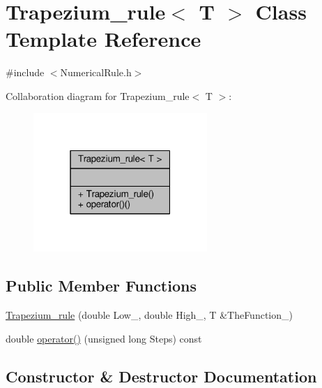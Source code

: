 \hypertarget{classTrapezium__rule}{}\section{Trapezium\+\_\+rule$<$ T $>$ Class Template Reference}
\label{classTrapezium__rule}


{\ttfamily \#include $<$Numerical\+Rule.\+h$>$}



Collaboration diagram for Trapezium\+\_\+rule$<$ T $>$\+:
\nopagebreak
\begin{figure}[H]
\begin{center}
\leavevmode
\includegraphics[width=187pt]{classTrapezium__rule__coll__graph}
\end{center}
\end{figure}
\subsection*{Public Member Functions}
\begin{DoxyCompactItemize}
\item 
\hyperlink{classTrapezium__rule_a4420bc5d0a679bd2659b7bccab1aef68}{Trapezium\+\_\+rule} (double Low\+\_\+, double High\+\_\+, T \&The\+Function\+\_\+)
\item 
double \hyperlink{classTrapezium__rule_a6f80a232d2a8fcb21d01b4ac2ec99f12}{operator()} (unsigned long Steps) const
\end{DoxyCompactItemize}


\subsection{Constructor \& Destructor Documentation}
\hypertarget{classTrapezium__rule_a4420bc5d0a679bd2659b7bccab1aef68}{}\label{classTrapezium__rule_a4420bc5d0a679bd2659b7bccab1aef68} 
